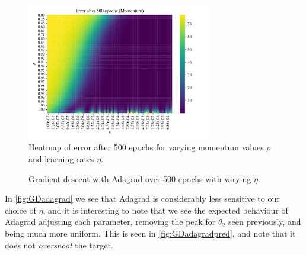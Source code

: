 \documentclass{article}
\theoremstyle{definition}
\begin{document}
\begin{figure}[H]%
    \centering
    \includegraphics[width=8cm]{Project2/figures/polynomial_grad/OLS_autodiff/momentum_heatmap_eta_rho.pdf}
    \caption{Heatmap of error after 500 epochs for varying momentum values $\rho$ and learning rates $\eta$.}
    \label{fig:GDmomentumheatmap}
\end{figure}

\begin{figure}[H]%
    \centering
    \qquad
    \caption{Gradient descent with Adagrad over 500 epochs with varying $\eta$.}%
    \label{fig:GDadagrad}%
\end{figure}

In \autoref{fig:GDadagrad} we see that Adagrad is considerably less sensitive to our choice of $\eta$, and it is interesting to note that we see the expected behaviour of Adagrad adjusting each parameter, removing the peak for $\theta_2$ seen previously, and being much more uniform. This is seen in \autoref{fig:GDadagradpred}, and note that it does not \textit{overshoot} the target.
\end{document}
